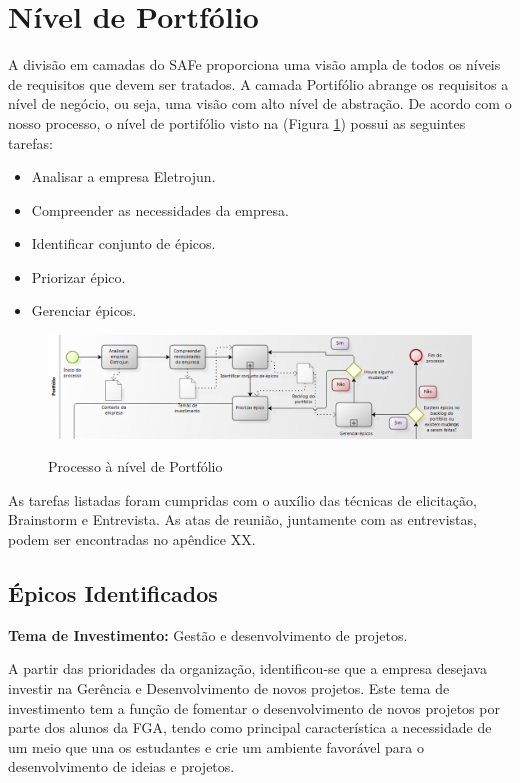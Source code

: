 \section {Nível de Portfólio}

A divisão em camadas do SAFe proporciona uma visão ampla de todos os níveis de requisitos que devem ser tratados. A camada Portifólio abrange os requisitos a nível de negócio, ou seja, uma visão com alto nível de abstração. De acordo com o nosso processo, o nível de portifólio visto na (Figura \ref{img:portfolio}) possui as seguintes tarefas:

\begin{itemize}
\item Analisar a empresa Eletrojun.
\item Compreender as necessidades da empresa.
\item Identificar conjunto de épicos.
\item Priorizar épico.
\item Gerenciar épicos.
\end{itemize}

\FloatBarrier
\begin{figure}[!htpd]
		\centering
		\includegraphics[scale=0.4]{figuras/portfolio}
		\label{img:portfolio}
		\caption{Processo à nível de Portfólio}
\end{figure}

As tarefas listadas foram cumpridas com o auxílio das técnicas de elicitação, Brainstorm e Entrevista. As atas de reunião, juntamente com as entrevistas, podem ser encontradas no apêndice XX.

\subsection {Épicos Identificados}

\textbf{Tema de Investimento:} Gestão e desenvolvimento de projetos.

 A partir das prioridades da organização, identificou-se que a empresa desejava investir na Gerência e Desenvolvimento de novos projetos. Este tema de investimento tem a função de fomentar o desenvolvimento de novos projetos por parte dos alunos da FGA, tendo como principal característica a necessidade de um meio que una os estudantes e crie um ambiente favorável para o desenvolvimento de ideias e projetos.

